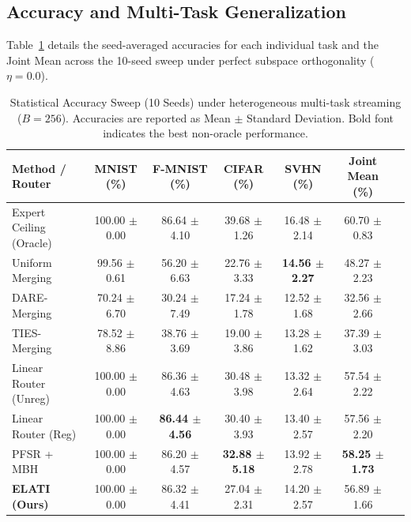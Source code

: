 \subsection{Accuracy and Multi-Task Generalization}
Table~\ref{tab:accuracy} details the seed-averaged accuracies for each individual task and the Joint Mean across the 10-seed sweep under perfect subspace orthogonality ($\eta = 0.0$).

\begin{table}[t]
\caption{Statistical Accuracy Sweep (10 Seeds) under heterogeneous multi-task streaming ($B=256$). Accuracies are reported as Mean $\pm$ Standard Deviation. Bold font indicates the best non-oracle performance.}
\label{tab:accuracy}
\vskip 0.15in
\begin{center}
\begin{small}
\begin{sc}
\begin{tabular}{lcccccr}
\toprule
Method / Router & MNIST (\%) & F-MNIST (\%) & CIFAR (\%) & SVHN (\%) & Joint Mean (\%) \\
\midrule
Expert Ceiling (Oracle) & 100.00 $\pm$ 0.00 & 86.64 $\pm$ 4.10 & 39.68 $\pm$ 1.26 & 16.48 $\pm$ 2.14 & 60.70 $\pm$ 0.83 \\
\midrule
Uniform Merging         & 99.56 $\pm$ 0.61  & 56.20 $\pm$ 6.63 & 22.76 $\pm$ 3.33 & \textbf{14.56 $\pm$ 2.27} & 48.27 $\pm$ 2.23 \\
DARE-Merging            & 70.24 $\pm$ 6.70  & 30.24 $\pm$ 7.49 & 17.24 $\pm$ 1.78 & 12.52 $\pm$ 1.68 & 32.56 $\pm$ 2.66 \\
TIES-Merging            & 78.52 $\pm$ 8.86  & 38.76 $\pm$ 3.69 & 19.00 $\pm$ 3.86 & 13.28 $\pm$ 1.62 & 37.39 $\pm$ 3.03 \\
Linear Router (Unreg)   & 100.00 $\pm$ 0.00 & 86.36 $\pm$ 4.63 & 30.48 $\pm$ 3.98 & 13.32 $\pm$ 2.64 & 57.54 $\pm$ 2.22 \\
Linear Router (Reg)     & 100.00 $\pm$ 0.00 & \textbf{86.44 $\pm$ 4.56} & 30.40 $\pm$ 3.93 & 13.40 $\pm$ 2.57 & 57.56 $\pm$ 2.20 \\
PFSR + MBH              & 100.00 $\pm$ 0.00 & 86.20 $\pm$ 4.57 & \textbf{32.88 $\pm$ 5.18} & 13.92 $\pm$ 2.78 & \textbf{58.25 $\pm$ 1.73} \\
\midrule
\textbf{ELATI (Ours)}   & 100.00 $\pm$ 0.00 & 86.32 $\pm$ 4.41 & 27.04 $\pm$ 2.31 & 14.20 $\pm$ 2.57 & 56.89 $\pm$ 1.66 \\
\bottomrule
\end{tabular}
\end{sc}
\end{small}
\end{center}
\vskip -0.1in
\end{table}

